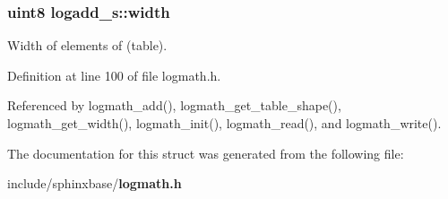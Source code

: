 \subsubsection[{width}]{\setlength{\rightskip}{0pt plus 5cm}uint8 logadd\+\_\+s\+::width}\label{structlogadd__s_a8e35a353d751d957270baf5192007c3e}


Width of elements of (table). 



Definition at line 100 of file logmath.\+h.



Referenced by logmath\+\_\+add(), logmath\+\_\+get\+\_\+table\+\_\+shape(), logmath\+\_\+get\+\_\+width(), logmath\+\_\+init(), logmath\+\_\+read(), and logmath\+\_\+write().



The documentation for this struct was generated from the following file\+:\begin{DoxyCompactItemize}
\item 
include/sphinxbase/{\bf logmath.\+h}\end{DoxyCompactItemize}
